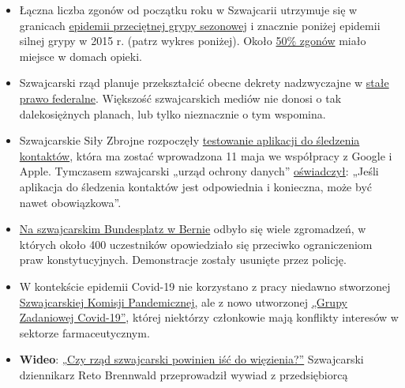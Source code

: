 \begin{itemize}
\tightlist
\item
  Łączna liczba zgonów od początku roku w Szwajcarii utrzymuje się w
  granicach
  \href{https://swprs.files.wordpress.com/2020/05/schweiz-todesfaelle-2010-2020_woche_17.pdf}{epidemii
  przeciętnej grypy sezonowej} i znacznie poniżej epidemii silnej grypy
  w 2015 r. (patrz wykres poniżej). Około
  \href{https://www.bluewin.ch/de/news/schweiz/sp-chef-levrat-will-die-reichen-schropfen-383977.html}{50\%
  zgonów} miało miejsce w domach opieki.
\item
  Szwajcarski rząd planuje przekształcić obecne dekrety nadzwyczajne w
  \href{https://www.admin.ch/gov/de/start/dokumentation/medienmitteilungen.msg-id-78929.html}{stałe
  prawo federalne}. Większość szwajcarskich mediów nie donosi o tak
  dalekosiężnych planach, lub tylko nieznacznie o tym wspomina.
\item
  Szwajcarskie Siły Zbrojne rozpoczęły
  \href{https://uncut-news.ch/wp-content/uploads/2020/05/Schweizer-Soldaten-k\%C3\%A4mpfen-bewaffnet-mit-Bluetooth-App-gegen-COVID-19.pdf}{testowanie
  aplikacji do śledzenia kontaktów}, która ma zostać wprowadzona 11 maja
  we współpracy z Google i Apple. Tymczasem szwajcarski „urząd ochrony
  danych''
  \href{https://www.nzz.ch/zuerich/coronavirus-in-zuerich-tracing-app-braucht-keine-freiwilligkeit-ld.1553964}{oświadczył}:
  „Jeśli aplikacja do śledzenia kontaktów jest odpowiednia i konieczna,
  może być nawet obowiązkowa''.
\item
  \href{https://www.zeitpunkt.ch/index.php/mahnwache-fuer-grundrechte-400-menschen-auf-dem-bundesplatz-wie-aus-dem-nichts}{Na
  szwajcarskim Bundesplatz w Bernie} odbyło się wiele zgromadzeń, w
  których około 400 uczestników opowiedziało się przeciwko ograniczeniom
  praw konstytucyjnych. Demonstracje zostały usunięte przez policję.
\item
  W kontekście epidemii Covid-19 nie korzystano z pracy niedawno
  stworzonej
  \href{https://www.srf.ch/news/schweiz/bag-verzichtete-auf-beratung-was-macht-die-pandemie-kommission-in-der-krise}{Szwajcarskiej
  Komisji Pandemicznej,} ale z nowo utworzonej
  \href{https://ncs-tf.ch/de/organisation}{„Grupy Zadaniowej
  Covid-19''}, której niektórzy członkowie mają konflikty interesów w
  sektorze farmaceutycznym.
\item
  \textbf{Wideo}:
  \href{https://www.youtube.com/watch?v=RyZGkdeQ6CY}{„Czy rząd
  szwajcarski powinien iść do więzienia?''} Szwajcarski dziennikarz Reto
  Brennwald przeprowadził wywiad z przedsiębiorcą

\end{itemize}
